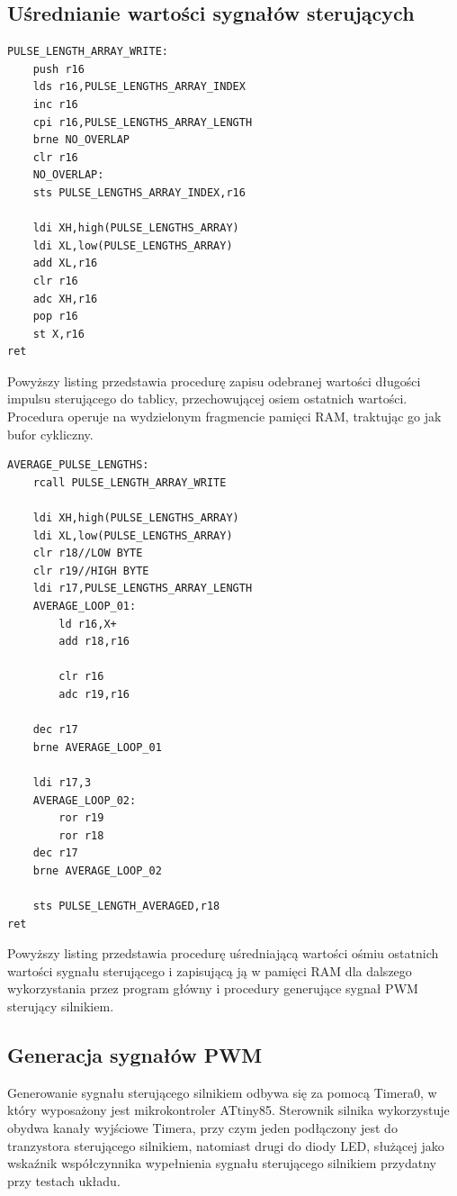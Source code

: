 \subsection{Uśrednianie wartości sygnałów sterujących}

\begin{lstlisting}
PULSE_LENGTH_ARRAY_WRITE:
	push r16
	lds r16,PULSE_LENGTHS_ARRAY_INDEX
	inc r16
	cpi r16,PULSE_LENGTHS_ARRAY_LENGTH
	brne NO_OVERLAP
	clr r16
	NO_OVERLAP:
	sts PULSE_LENGTHS_ARRAY_INDEX,r16	

	ldi XH,high(PULSE_LENGTHS_ARRAY)
	ldi XL,low(PULSE_LENGTHS_ARRAY)
	add XL,r16
	clr r16
	adc XH,r16
	pop r16
	st X,r16
ret
\end{lstlisting}

Powyższy listing przedstawia procedurę zapisu odebranej wartości długości impulsu sterującego do tablicy, przechowującej osiem ostatnich wartości. Procedura operuje na wydzielonym fragmencie pamięci RAM, traktując go jak bufor cykliczny. 

\begin{lstlisting}
AVERAGE_PULSE_LENGTHS:
	rcall PULSE_LENGTH_ARRAY_WRITE

	ldi XH,high(PULSE_LENGTHS_ARRAY)
	ldi XL,low(PULSE_LENGTHS_ARRAY)
	clr r18//LOW BYTE
	clr r19//HIGH BYTE
	ldi r17,PULSE_LENGTHS_ARRAY_LENGTH
	AVERAGE_LOOP_01:
		ld r16,X+
		add r18,r16

		clr r16
		adc r19,r16

	dec r17
	brne AVERAGE_LOOP_01
	
	ldi r17,3
	AVERAGE_LOOP_02:
		ror r19
		ror r18
	dec r17
	brne AVERAGE_LOOP_02

	sts PULSE_LENGTH_AVERAGED,r18
ret
\end{lstlisting}

Powyższy listing przedstawia procedurę uśredniającą wartości ośmiu ostatnich wartości sygnału sterującego i zapisującą ją w pamięci RAM dla dalszego wykorzystania przez program główny i procedury generujące sygnał PWM sterujący silnikiem.

\subsection{Generacja sygnałów PWM}

Generowanie sygnału sterującego silnikiem odbywa się za pomocą Timera0, w który wyposażony jest mikrokontroler ATtiny85. Sterownik silnika wykorzystuje obydwa kanały wyjściowe Timera, przy czym jeden podłączony jest do tranzystora sterującego silnikiem, natomiast drugi do diody LED, służącej jako wskaźnik współczynnika wypełnienia sygnału sterującego silnikiem przydatny przy testach układu. 

